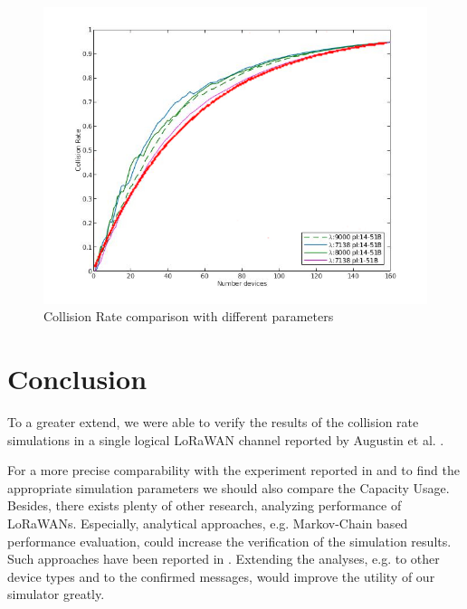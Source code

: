 \documentclass{article}
\begin{document}
\begin{figure}[h]
    \centering
    \includegraphics[width=1\textwidth]{./figures/collision_rate_compare_final}
    \caption{Collision Rate comparison with different parameters}
    \label{fig:collissionratecomparisonfinal}
\end{figure}

\section{Conclusion}
To a greater extend, we were able to verify the results of the collision rate
simulations in a single logical LoRaWAN channel reported by Augustin et al.
\cite{augustin2016study}.

For a more precise comparability with the experiment reported in
\cite{augustin2016study} and to find the appropriate simulation parameters we
should also compare the Capacity Usage. Besides, there exists plenty of other
research, analyzing performance of LoRaWANs. Especially, analytical approaches,
e.g. Markov-Chain based performance evaluation, could increase the verification
of the simulation results. Such approaches have been reported in
\cite{sorensen2017analysis, delobel2017analysis, ferre2017collision}.
Extending the analyses, e.g. to other device types and to the confirmed
messages, would improve the utility of our simulator greatly.
\end{document}

